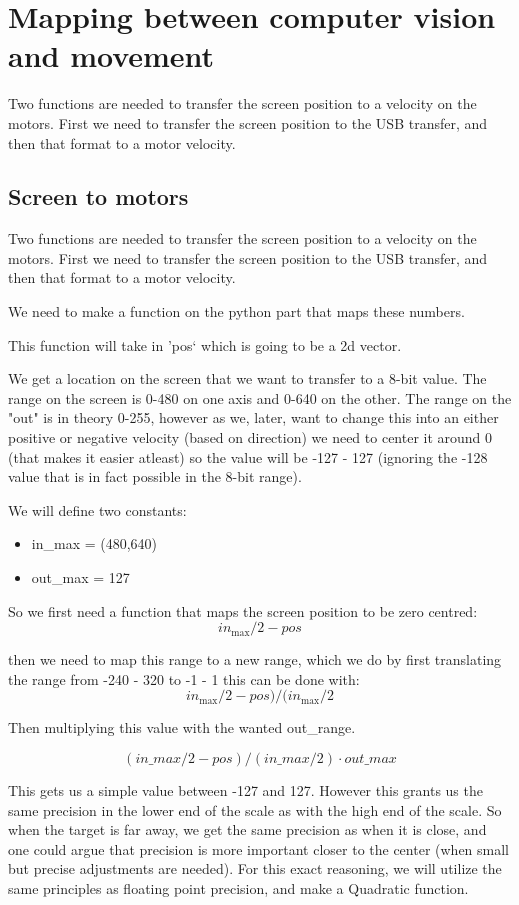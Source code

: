\section{Mapping between computer vision and movement}
Two functions are needed to transfer the screen position to a velocity on the motors.
First we need to transfer the screen position to the USB transfer, and then that format to a motor velocity.

\subsection{Screen to motors}
Two functions are needed to transfer the screen position to a velocity on the motors.
First we need to transfer the screen position to the USB transfer, and then that format to a motor velocity.

We need to make a function on the python part that maps these numbers.

This function will take in 'pos` which is going to be a 2d vector.

We get a location on the screen that we want to transfer to a 8-bit value. 
The range on the screen is 0-480 on one axis and 0-640 on the other.
The range on the "out" is in theory 0-255, however as we, later, want to change this into an either positive or negative velocity (based on direction) we need to center it around 0 (that makes it easier atleast) so the value will be -127 - 127 (ignoring the -128 value that is in fact possible in the 8-bit range).


We will define two constants:
\begin{itemize}
\item in\_max = (480,640)
\item out\_max = 127
\end{itemize}

So we first need a function that maps the screen position to be zero centred: 
$$
in_\text{max}/2 - pos
$$

then we need to map this range to a new range, which we do by first translating the range from -240 - 320 to -1 - 1
this can be done with:
$$
in_\text{max}/2 - pos)/(in_\text{max}/2
$$


Then multiplying this value with the wanted out\_range.

$$
(in\_max/2 - pos)/(in\_max/2) \cdot out\_max
$$

This gets us a simple value between -127 and 127. However this grants us the same precision in the lower end of the scale as with the high end of the scale.
So when the target is far away, we get the same precision as when it is close, and one could argue that precision is more important closer to the center (when small but precise adjustments are needed).
For this exact reasoning, we will utilize the same principles as floating point precision, and make a Quadratic function. 

